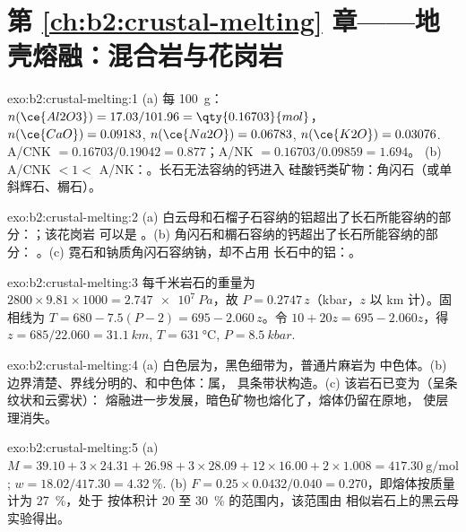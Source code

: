 \section*{第 \ref{ch:b2:crustal-melting} 章——地壳熔融：混合岩与花岗岩}

\begin{solution}{exo:b2:crustal-melting:1}
(a) 每 \qty{100}{\gram}：$n(\ce{Al2O3}) = 17.03/101.96 = \qty{0.16703}{mol}$，
$n(\ce{CaO}) = 0.09183$, $n(\ce{Na2O}) = 0.06783$, $n(\ce{K2O}) = 0.03076$.
A/CNK $= 0.16703/0.19042 = 0.877$；A/NK $= 0.16703/0.09859 = 1.694$。
(b) A/CNK $< 1 <$ A/NK：。长石无法容纳的钙进入
硅酸钙类矿物：角闪石（或单斜辉石、榍石）。
\end{solution}

\begin{solution}{exo:b2:crustal-melting:2}
(a) 白云母和石榴子石容纳的铝超出了长石所能容纳的部分：；该花岗岩
可以是 。(b) 角闪石和榍石容纳的钙超出了长石所能容纳的部分：
。(c) 霓石和钠质角闪石容纳钠，却不占用
长石中的铝：。
\end{solution}

\begin{solution}{exo:b2:crustal-melting:3}
每千米岩石的重量为 $2800\times9.81\times1000 = \qty{2.747e7}{Pa}$，故
$P = 0.2747\,z$（\unit{kbar}，$z$ 以 \unit{km} 计）。固相线为 $T = 680 - 7.5(P -
2) = 695 - 2.060\,z$。令 $10 + 20z = 695 - 2.060z$，得 $z = 685/22.060 =
\qty{31.1}{km}$, $T = \qty{631}{\celsius}$, $P = \qty{8.5}{kbar}$.
\end{solution}

\begin{solution}{exo:b2:crustal-melting:4}
(a) 白色层为，黑色细带为，普通片麻岩为
中色体。(b) 边界清楚、界线分明的、和中色体：属，
具条带状构造。(c) 该岩石已变为（呈条纹状和云雾状）：
熔融进一步发展，暗色矿物也熔化了，熔体仍留在原地，
使层理消失。
\end{solution}

\begin{solution}{exo:b2:crustal-melting:5}
(a) $M = 39.10 + 3\times24.31 + 26.98 + 3\times28.09 + 12\times16.00 + 2\times1.008 =
\qty{417.30}{\gram\per\mole}$; $w = 18.02/417.30 = \qty{4.32}{\percent}$.
(b) $F = 0.25\times0.0432/0.040 = 0.270$，即熔体按质量计为 \qty{27}{\percent}，处于
按体积计 20 至 \qty{30}{\percent} 的范围内，该范围由
相似岩石上的黑云母实验得出。
\end{solution}

